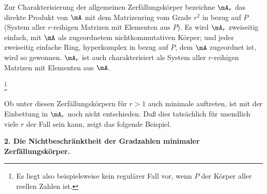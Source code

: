 Zur Charakterisierung der allgemeinen Zerfällungskörper bezeichne $\mA_r$ das direkte Produkt von $\mA$ mit dem Matrizenring vom Grade $r^2$ in bezug auf $P$ (System aller $r$-reihigen Matrizen mit Elementen aus $P$). Es wird $\mA_r$ zweiseitig einfach, mit $\mA$ als zugeordnetem nichtkommutativen Körper; und jeder zweiseitig einfache Ring, hyperkomplex in bezug auf $P$, dem $\mA$ zugeordnet ist, wird so gewonnen. $\mA_r$ ist auch charakterisiert als System aller $r$-reihigen Matrizen mit Elementen aus $\mA$.

\footnote{Es liegt also beispielsweise kein regulärer Fall vor, wenn $P$ der Körper aller reellen Zahlen ist.}

Ob unter diesen Zerfällungskörpern für $r>1$ auch minimale auftreten, ist mit der Einbettung in $\mA_r$ noch nicht entschieden. Daß dies tatsächlich für unendlich viele $r$ der Fall sein kann, zeigt das folgende Beispiel.

\begin{center}
\textbf{2. Die Nichtbeschränktheit der Gradzahlen minimaler\\
Zerfällungskörper.}
\end{center}

